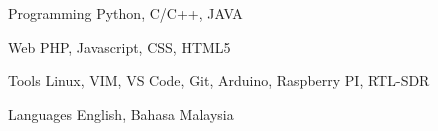 

\begin{cvskills}

  \cvskill
    {Programming} %
    {Python, C/C++, JAVA} %

  \cvskill
    {Web} %
    {PHP, Javascript, CSS, HTML5} %

  \cvskill
    {Tools} %
    {Linux, VIM, VS Code, Git, Arduino, Raspberry PI, RTL-SDR} %

  \cvskill
    {Languages} %
    {English, Bahasa Malaysia} %

\end{cvskills}
